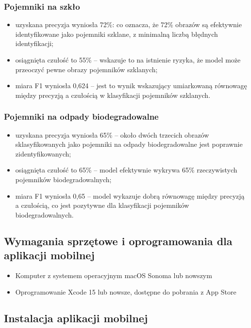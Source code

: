 \documentclass[12pt, a4paper, twoside, openany]{book}
\begin{document}
\subsubsection{Pojemniki na szkło}

\begin{itemize}[label=--]
    \item uzyskana precyzja wyniosła 72\%: co oznacza, że 72\% obrazów są efektywnie identyfikowane jako pojemniki szklane, z minimalną liczbą błędnych identyfikacji;
    \item osiągnięta czułość to 55\% -- wskazuje to na istnienie ryzyka, że model może przeoczyć pewne obrazy pojemników szklanych;
    \item miara F1 wyniosła 0,624 -- jest to wynik wskazujący umiarkowaną równowagę między precyzją a czułością w klasyfikacji pojemników szklanych.
\end{itemize}

\subsubsection{Pojemniki na odpady biodegradowalne}

\begin{itemize}[label=--]
    \item uzyskana precyzja wyniosła 65\% -- około dwóch trzecich obrazów sklasyfikowanych jako pojemniki na odpady biodegradowalne jest poprawnie zidentyfikowanych;
    \item osiągnięta czułość to 65\% -- model efektywnie wykrywa 65\% rzeczywistych pojemników biodegradowalnych;
    \item miara F1 wyniosła 0,65 -- model wykazuje dobrą równowagę między precyzją a czułością, co jest pozytywne dla klasyfikacji pojemników biodegradowalnych.
\end{itemize}

\subsection{Wymagania sprzętowe i oprogramowania dla aplikacji mobilnej}
\begin{itemize}[label=--]
    \item Komputer z systemem operacyjnym macOS Sonoma lub nowszym
    \item Oprogramowanie Xcode 15 lub nowsze, dostępne do pobrania z App Store
\end{itemize}

\subsection{Instalacja aplikacji mobilnej}
\end{document}
